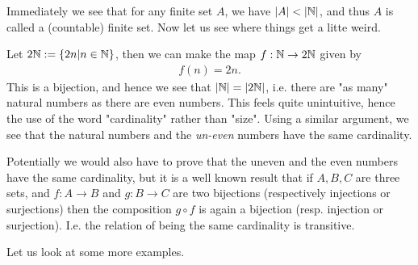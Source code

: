 \documentclass[../../textbook.tex]{subfiles}
\begin{document}
Immediately we see that for any finite set $A$, we have $\left|A\right|<\left|\mathbb{N}\right|$, and thus $A$ is called a (countable) finite set. Now let us see where things get a litte weird.

Let $2\mathbb{N}:=\{2n | n \in \mathbb{N}\}$, then we can make the map $f:\mathbb{N} \to 2\mathbb{N}$ given by
\begin{align*}
    f(n)=2n.
\end{align*}
This is a bijection, and hence we see that $\left|\mathbb{N}\right|=\left|2\mathbb{N}\right|$, i.e. there are "as many" natural numbers as there are even numbers. This feels quite unintuitive, hence the use of the word "cardinality" rather than "size". Using a similar argument, we see that the natural numbers and the \emph{un-even} numbers have the same cardinality.

Potentially we would also have to prove that the uneven and the even numbers have the same cardinality, but it is a well known result that if $A,B,C$ are three sets, and $f:A\to B$ and $g: B \to C$ are two bijections (respectively injections or surjections) then the composition $g\circ f$ is again a bijection (resp. injection or surjection). I.e. the relation of being the same cardinality is transitive.

Let us look at some more examples.
\end{document}
